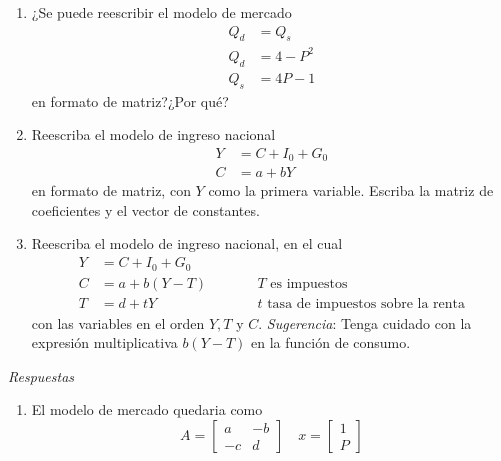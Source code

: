 \begin{ejercicio}
\begin{enumerate}
$$\begin{aligned}
        & Q_{d2}=\alpha_0+\alpha_1P_1+\alpha_2P_2 \\
        & Q_{s2}=\beta_0+\beta_1P_1+\beta_2P_2
        \end{aligned}
        $$
        en el formato de matriz con las variables dispuestas en el siguiente orden: \(Q_{d1}, Q_{s1}, Q_{d2}, Q_{s2}, P_1, P_2\). Escriba la matriz de coeficientes, el vector de variables y el vector de constantes.
        \item ¿Se puede reescribir el modelo de mercado 
        $$
        \begin{aligned}
        Q_d &= Q_s \\
        Q_d &= 4-P^2 \\
        Q_s &= 4P-1
        \end{aligned}
        $$
        en formato de matriz?¿Por qué?
        \item Reescriba el modelo de ingreso nacional 
        $$
        \begin{aligned}
        Y &= C + I_0 + G_0 \\
        C &= a + bY
        \end{aligned}
        $$
        en formato de matriz, con \(Y\) como la primera variable. Escriba la matriz de coeficientes y el vector de constantes.
        \item Reescriba el modelo de ingreso nacional, en el cual 
        $$
        \begin{aligned}
            Y &= C+I_0+G_0 \\
            C &=a+b(Y-T) \qquad &&T\text{ es impuestos} \\
            T &= d+tY \qquad &&t\text{ tasa de impuestos sobre la renta}
        \end{aligned}
        $$
        con las variables en el orden \(Y, T\) y \(C\). \textit{Sugerencia}: Tenga cuidado con la expresión multiplicativa \(b(Y-T)\) en la función de consumo.
    \end{enumerate}
    \emph{Respuestas}
    \begin{enumerate}
        \item El modelo de mercado quedaria como
        \[
        A = \begin{bmatrix}
            a & -b \\ 
            -c & d
        \end{bmatrix}
        \quad
        x = \begin{bmatrix}
            1 \\
            P
        \end{bmatrix}
\]
\end{enumerate}
\end{ejercicio}
